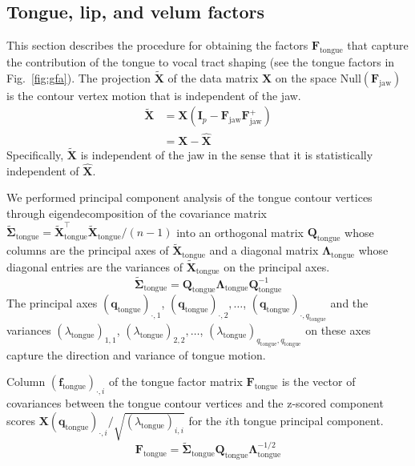 \documentclass[preprint]{JASAnew}\usepackage[]{graphicx}\usepackage[]{color}
\begin{document}
\subsection{Tongue, lip, and velum factors}
\label{subsec:residfactors}

This section describes the procedure for obtaining the factors $\mathbf{F}_\text{tongue}$ that capture the contribution of the tongue to vocal tract shaping  (see the tongue factors in Fig.~\ref{fig:gfa}). 
% 
The projection $\mathbf{\tilde{X}}$ of the data matrix $\mathbf{X}$ on the space $\mathrm{Null}(\mathbf{F}_\text{jaw})$ is the contour vertex motion that is independent of the jaw.
%
\begin{align} \label{eq:XXX}
\mathbf{\tilde{X}} 
&= \mathbf{X} \left( \mathbf{I}_p - \mathbf{F}_\text{jaw}\mathbf{F}_\text{jaw}^+ \right) \\
&= \mathbf{X} - \mathbf{\hat{X}} 
\end{align}
%
Specifically, $\mathbf{\tilde{X}}$ is independent of the jaw in the sense that it is statistically independent of $\mathbf{\hat{X}}$. 
%





We performed principal component analysis of the tongue contour vertices through eigendecomposition of the covariance matrix $\boldsymbol{\tilde{\Sigma}}_\text{tongue} = \mathbf{\tilde{X}}_\text{tongue}^\intercal \mathbf{\tilde{X}}_\text{tongue}/(n-1)$ into an orthogonal matrix $\mathbf{Q}_\text{tongue}$ whose columns are the principal axes of $\mathbf{\tilde{X}}_\text{tongue}$ and a diagonal matrix $\boldsymbol{\Lambda}_\text{tongue}$ whose diagonal entries are the variances of $\mathbf{\tilde{X}}_\text{tongue}$ on the principal axes.
% 
\begin{equation}
\boldsymbol{\tilde{\Sigma}}_\text{tongue} = \mathbf{Q}_\text{tongue} \boldsymbol{\Lambda}_\text{tongue} \mathbf{Q}_\text{tongue}^{-1}
\end{equation}
%
The principal axes $(\mathbf{q}_\text{tongue})_{\cdot,1}$, $(\mathbf{q}_\text{tongue})_{\cdot,2}, \ldots$, $(\mathbf{q}_\text{tongue})_{\cdot,q_\text{tongue}}$ and the variances $(\lambda_\text{tongue})_{1,1}$, $(\lambda_\text{tongue})_{2,2}, \ldots$, $(\lambda_\text{tongue})_{q_\text{tongue},q_\text{tongue}}$ on these axes capture the direction and variance of tongue motion.


Column $(\mathbf{f}_\text{tongue})_{\cdot,i}$ of the tongue factor matrix $\mathbf{F}_\text{tongue}$ is the vector of covariances between the tongue contour vertices and the z-scored component scores $\mathbf{X} (\mathbf{q}_\text{tongue})_{\cdot,i} / \sqrt{(\lambda_\text{tongue})_{i,i}}$ for the $i$th tongue principal component. 
%
\begin{equation}
\mathbf{F}_\text{tongue}
 = \boldsymbol{\tilde{\Sigma}}_\text{tongue} \mathbf{Q}_\text{tongue} \boldsymbol{\Lambda}_\text{tongue}^{-1/2}
\end{equation}
\end{document}
